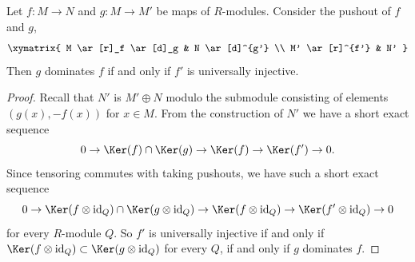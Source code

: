 \begin{lemma}
\label{lemma-domination-universally-injective}
Let $f : M \to N$ and $g : M \to M'$ be maps of $R$-modules.
Consider the pushout of $f$ and $g$,
$$
\xymatrix{
M  \ar[r]_f \ar[d]_g & N \ar[d]^{g'} \\
M' \ar[r]^{f'} & N'
}
$$
Then $g$ dominates $f$ if and only if $f'$ is universally injective.
\end{lemma}

\begin{proof}
Recall that $N'$ is $M' \oplus N$ modulo the submodule consisting of elements
$(g(x), -f(x))$ for $x \in M$.
From the construction of $N'$ we have a short exact sequence
$$
0 \to \Ker(f) \cap \Ker(g) \to \Ker(f) \to \Ker(f')
\to 0.
$$
Since tensoring commutes with taking pushouts, we have such a short exact
sequence
$$
0 \to \Ker(f \otimes \text{id}_Q ) \cap \Ker(g \otimes
\text{id}_Q) \to \Ker(f \otimes \text{id}_Q)
\to \Ker(f' \otimes \text{id}_Q) \to 0
$$
for every $R$-module $Q$.  So $f'$ is universally injective if and only if
$\Ker(f \otimes \text{id}_Q ) \subset \Ker(g \otimes
\text{id}_Q)$ for every $Q$, if and only if $g$ dominates $f$.
\end{proof}
